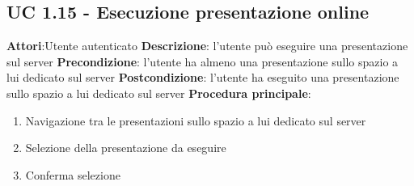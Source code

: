 \subsection{UC 1.15 - Esecuzione presentazione online}{
\textbf{Attori}:Utente autenticato
	\textbf{Descrizione}: l'utente può eseguire una presentazione sul server
	\textbf{Precondizione}: l'utente ha almeno una presentazione sullo spazio a lui dedicato sul server
	\textbf{Postcondizione}: l'utente ha eseguito una presentazione sullo spazio a lui dedicato sul server
	\textbf{Procedura principale}:
	\begin{enumerate}
		\item Navigazione tra le presentazioni sullo spazio a lui dedicato sul server
		\item Selezione della presentazione da eseguire
		\item Conferma selezione
	\end{enumerate}
}